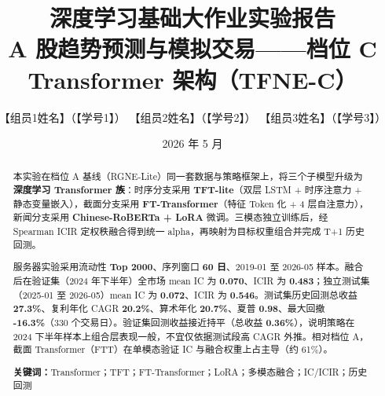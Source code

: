 \documentclass[UTF8,a4paper,12pt]{ctexart}
\title{\textbf{深度学习基础大作业实验报告}\\[0.4em]
\large A 股趋势预测与模拟交易——档位 C Transformer 架构（TFNE-C）}
\author{
  【组员1姓名】（【学号1】）\quad
  【组员2姓名】（【学号2】）\quad
  【组员3姓名】（【学号3】）
}
\date{2026 年 5 月}
\begin{document}
\maketitle
\thispagestyle{empty}

\begin{center}
\end{center}

\begin{abstract}
本实验在档位 A 基线（RGNE-Lite）同一套数据与策略框架上，将三个子模型升级为\textbf{深度学习 Transformer 族}：时序分支采用 \textbf{TFT-lite}（双层 LSTM + 时序注意力 + 静态变量嵌入），截面分支采用 \textbf{FT-Transformer}（特征 Token 化 + 4 层自注意力），新闻分支采用 \textbf{Chinese-RoBERTa + LoRA} 微调。三模态独立训练后，经 Spearman ICIR 定权秩融合得到统一 alpha，再映射为目标权重组合并完成 T+1 历史回测。

服务器实验采用流动性 \textbf{Top 2000}、序列窗口 \textbf{60 日}、2019-01 至 2026-05 样本。融合后在验证集（2024 年下半年）全市场 mean IC 为 \textbf{0.070}、ICIR 为 \textbf{0.483}；独立测试集（2025-01 至 2026-05）mean IC 为 \textbf{0.072}、ICIR 为 \textbf{0.546}。测试集历史回测总收益 \textbf{27.3\%}、复利年化 CAGR \textbf{20.2\%}、算术年化 \textbf{20.7\%}、夏普 \textbf{0.98}、最大回撤 \textbf{-16.3\%}（330 个交易日）。验证集回测收益接近持平（总收益 \textbf{0.36\%}），说明策略在 2024 下半年样本上组合层表现一般，不宜仅依据测试段高 CAGR 外推。相对档位 A，截面 Transformer（FTT）在单模态验证 IC 与融合权重上占主导（约 61\%）。

\vspace{0.5em}
\noindent\textbf{关键词：}Transformer；TFT；FT-Transformer；LoRA；多模态融合；IC/ICIR；历史回测
\end{abstract}

\tableofcontents
\newpage

\end{document}
